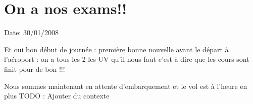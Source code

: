 \section{On a nos exams!!}

Date: 30/01/2008

\begin{multicols}{2}

Et oui bon début de journée : première bonne nouvelle avant le départ à l'aéroport : on a tous les 2 les UV qu'il nous faut c'est à dire que les cours sont finit pour de bon !!!

Nous sommes maintenant en attente d'embarquement et le vol est à l'heure en plus
TODO : Ajouter du contexte

\end{multicols}


